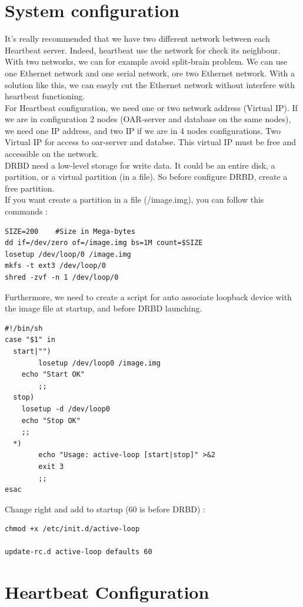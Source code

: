 \documentclass[a4paper,10pt]{report}
\begin{document}
\section{System configuration}
It's really recommended that we have two different network between each Heartbeat server. Indeed, heartbeat use the network for check its neighbour. With two networks, we can for example avoid split-brain problem. We can use one Ethernet network and one serial network, ore two Ethernet network. With a solution like this, we can easyly cut the Ethernet network without interfere with heartbeat functioning.\\
For Heartbeat configuration, we need one or two network address (Virtual IP). If we are in configuration 2 nodes (OAR-server and database on the same nodes), we need one IP address, and two IP if we are in 4 nodes configurations. Two Virtual IP for access to oar-server and databse. This virtual IP must be free and accessible on the network.\\
DRBD need a low-level storage for write data. It could be an entire disk, a partition, or a virtual partition (in a file). So before configure DRBD, create a free partition.\\
If you want create a partition in a file (/image.img), you can follow this commands :
\begin{lstlisting}
SIZE=200	#Size in Mega-bytes
dd if=/dev/zero of=/image.img bs=1M count=$SIZE
losetup /dev/loop/0 /image.img
mkfs -t ext3 /dev/loop/0
shred -zvf -n 1 /dev/loop/0	
\end{lstlisting}
Furthermore, we need to create a script for auto associate loopback device with the image file at startup, and before DRBD launching.
\begin{lstlisting}
#!/bin/sh
case "$1" in
  start|"") 
        losetup /dev/loop0 /image.img
	echo "Start OK"
        ;;
  stop)
	losetup -d /dev/loop0
	echo "Stop OK"
	;;
  *)
        echo "Usage: active-loop [start|stop]" >&2
        exit 3
        ;;
esac
\end{lstlisting}
Change right and add to startup (60 is before DRBD) :
\begin{lstlisting}
chmod +x /etc/init.d/active-loop

update-rc.d active-loop defaults 60
\end{lstlisting}


\section{Heartbeat Configuration}
\end{document}
